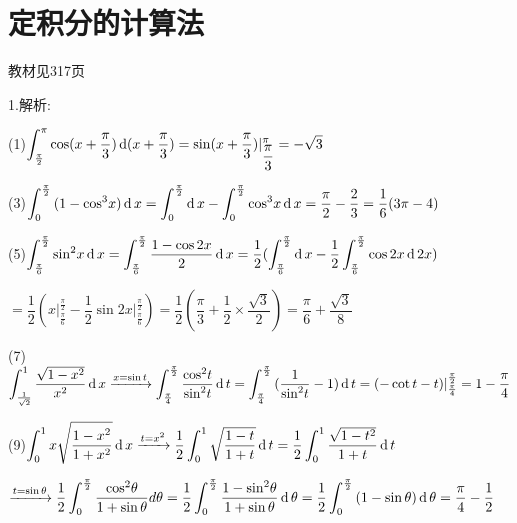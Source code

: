 \section{定积分的计算法}
\begin{flushright}
  \color{zhanqing!80}
   教材见317页 %
\end{flushright}

1.解析:

(1)$\displaystyle\int_{\frac{\pi }{2}}^\pi  {\cos (x + \dfrac{\pi }{3})} \operatorname{\mathop{}\!\mathrm{d}} (x + \dfrac{\pi }{3}) = \sin (x + \dfrac{\pi }{3})|_{\dfrac{\pi }{3}}^\pi  =  - \sqrt 3 $

(3)$\displaystyle\int_0^{\frac{\pi }{2}} {(1 - {{\cos }^3}x)} \operatorname{\mathop{}\!\mathrm{d}} x = \displaystyle\int_0^{\frac{\pi }{2}} {\operatorname{\mathop{}\!\mathrm{d}} x}  - \displaystyle\int_0^{\frac{\pi }{2}} {{{\cos }^3}x} \operatorname{\mathop{}\!\mathrm{d}} x = \dfrac{\pi }{2} - \dfrac{2}{3} = \dfrac{1}{6}(3\pi  - 4)$

(5)$\displaystyle\int_{\frac{\pi }{6}}^{\frac{\pi }{2}} {{{\sin }^2}x} \operatorname{\mathop{}\!\mathrm{d}} x = \displaystyle\int_{\frac{\pi }{6}}^{\frac{\pi }{2}} {\dfrac{{1 - \cos 2x}}{2}} \operatorname{\mathop{}\!\mathrm{d}} x = \frac{1}{2}(\displaystyle\int_{\frac{\pi }{6}}^{\frac{\pi }{2}} \operatorname{\mathop{}\!\mathrm{d}} x - \frac{1}{2}\displaystyle\int_{\frac{\pi }{6}}^{\frac{\pi }{2}} {\cos 2x} \operatorname{\mathop{}\!\mathrm{d}} 2x)$

$= \dfrac{1}{2}( x\Big|_{\frac{\pi }{6}}^{\frac{\pi }{2}} - \dfrac{1}{2}\sin 2x\Big|_{\frac{\pi }{6}}^{\frac{\pi }{2}}) = \dfrac{1}{2}(\dfrac{\pi }{3} + \dfrac{1}{2} \times \dfrac{{\sqrt 3 }}{2}) = \dfrac{\pi }{6} + \dfrac{{\sqrt 3 }}{8}$

(7)$\displaystyle\int_{\frac{1}{{\sqrt 2 }}}^1 {\dfrac{{\sqrt {1 - {x^2}} }}{{{x^2}}}} \operatorname{\mathop{}\!\mathrm{d}} x\xrightarrow{{x = \sin t}}\displaystyle\int_{\frac{\pi }{4}}^{\frac{\pi }{2}} {\dfrac{{{{\cos }^2}t}}{{{{\sin }^2}t}}} \operatorname{\mathop{}\!\mathrm{d}} t = \displaystyle\int_{\frac{\pi }{4}}^{\frac{\pi }{2}} {(\dfrac{1}{{{{\sin }^2}t}}}  - 1)\operatorname{\mathop{}\!\mathrm{d}} t = ( - \cot t - t)|_{\frac{\pi }{4}}^{\frac{\pi }{2}} = 1 - \dfrac{\pi }{4} $

(9)$\displaystyle\int_0^1 {x\sqrt {\dfrac{{1 - {x^2}}}{{1 + {x^2}}}} } \operatorname{\mathop{}\!\mathrm{d}} x\xrightarrow{{t = {x^2}}}\dfrac{1}{2}\displaystyle\int_0^1 {\sqrt {\dfrac{{1 - t}}{{1 + t}}} } \operatorname{\mathop{}\!\mathrm{d}} t = \dfrac{1}{2}\displaystyle\int_0^1 {\dfrac{{\sqrt {1 - {t^2}} }}{{1 + t}}} \operatorname{\mathop{}\!\mathrm{d}} t$

$\xrightarrow{{t = \sin \theta }}\dfrac{1}{2}\displaystyle\int_0^{\frac{\pi }{2}} {\dfrac{{{{\cos }^2}\theta }}{{1 + \sin \theta }}} d\theta  = \dfrac{1}{2}\displaystyle\int_0^{\frac{\pi }{2}} {\dfrac{{1 - {{\sin }^2}\theta }}{{1 + \sin \theta }}} \operatorname{\mathop{}\!\mathrm{d}} \theta  = \dfrac{1}{2}\displaystyle\int_0^{\frac{\pi }{2}} {(1 - \sin \theta )} \operatorname{\mathop{}\!\mathrm{d}} \theta  = \dfrac{\pi }{4} - \dfrac{1}{2}$

